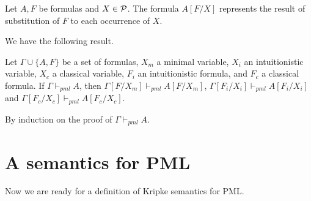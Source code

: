 \documentclass{jancl}
\begin{document}
\begin{definition}
Let $A,F$ be formulas and $X \in {\cal P}$. The
formula $A[F/X]$ represents the result of substitution of $F$ to each
occurrence of $X$.
\end{definition}

We have the following result.

\begin{theorem}
Let ${\Gamma} \cup \{A,F\}$ be a set of formulas, $X_m$ a minimal variable,
$X_i$ an intuitionistic variable, $X_c$ a classical variable, $F_i$ an
intuitionistic formula, and $F_c$ a classical formula. If ${\Gamma} {\vdash}_{pml}
A$, then ${\Gamma}[F/X_m] {\vdash}_{pml} A[F/X_m]$, ${\Gamma}[F_i/X_i] {\vdash}_{pml}
A[F_i/X_i]$ and ${\Gamma}[F_c/X_c] {\vdash}_{pml} A[F_c/X_c]$.
\end{theorem}

\begin{proof*}
By induction on the proof of ${\Gamma} {\vdash}_{pml} A$.
\end{proof*}

\section{A semantics for PML}

Now we are ready for a definition of Kripke semantics for PML.
\end{document}
